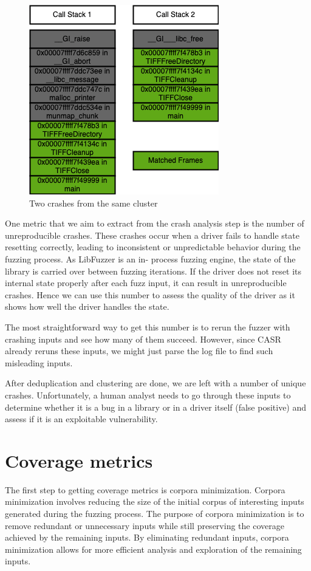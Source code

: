 \documentclass[a4paper,11pt,oneside]{report}
\begin{document}
\begin{figure}[htb]
	\centering
	\includegraphics[]{figures/callstacks.png}
	\caption{Two crashes from the same cluster}
	\label{fig:callstacks}
\end{figure}

One metric that we aim to extract from the crash analysis step is the 
number of unreproducible crashes. These crashes occur when a driver fails 
to handle state resetting correctly, leading to inconsistent or 
unpredictable behavior during the fuzzing process. As LibFuzzer is an in-
process fuzzing engine, the state of the library is carried over between 
fuzzing iterations. If the driver does not reset its internal state 
properly after each fuzz input, it can result in unreproducible crashes.
Hence we can use this number to assess the quality of the driver as it 
shows how well the driver handles the state. 

The most straightforward way to get this number is to rerun the fuzzer with 
crashing inputs and see how many of them succeed. However, since CASR
already reruns these inputs, we might just parse the log file to find such
misleading inputs.

After deduplication and clustering are done, we are left with a number of
unique crashes. Unfortunately, a human analyst needs to go through these
inputs to determine whether it is a bug in a library or in a driver 
itself (false positive) and assess if it is an exploitable vulnerability.

\section{Coverage metrics}
The first step to getting coverage metrics is corpora minimization. Corpora 
minimization involves reducing the size of the initial corpus of interesting 
inputs generated during the fuzzing process. The purpose of corpora minimization 
is to remove redundant or unnecessary inputs while still preserving the coverage 
achieved by the remaining inputs. By eliminating redundant inputs, corpora 
minimization allows for more efficient analysis and exploration of the remaining inputs.
\end{document}
